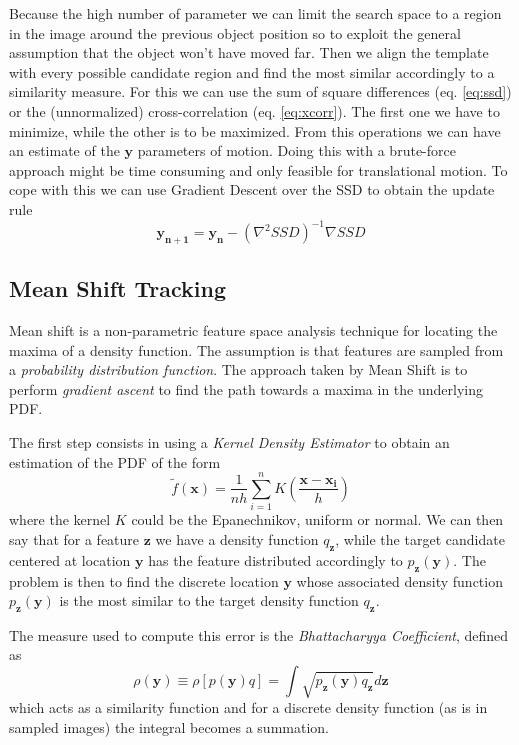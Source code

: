 \documentclass[a4paper,twocolumn]{article}
\begin{document}
Because the high number of parameter we can limit the search space to a region
in the image around the previous object position so to exploit the general
assumption that the object won't have moved far. Then we align the template with
every possible candidate region and find the most similar accordingly to a
similarity measure. For this we can use the sum of square differences (eq.
\ref{eq:ssd}) or the (unnormalized) cross-correlation (eq. \ref{eq:xcorr}). The
first one we have to minimize, while the other is to be maximized. From this
operations we can have an estimate of the $\mathbf{y}$ parameters of motion.
Doing this with a brute-force approach might be time consuming and only feasible
for translational motion. To cope with this we can use Gradient Descent over the
SSD to obtain the update rule
\begin{equation}
	\mathbf{y_{n+1}}=\mathbf{y_n}-(\nabla^2SSD)^{-1}\nabla SSD
\end{equation}


\subsection{Mean Shift Tracking}
Mean shift is a non-parametric feature space analysis technique for locating the
maxima of a density function. The assumption is that features are sampled from a
\textit{probability distribution function}. The approach taken by Mean Shift is
to perform \textit{gradient ascent} to find the path towards a maxima in the underlying
PDF.

The first step consists in using a \textit{Kernel Density Estimator} to obtain
an estimation of the PDF of the form
\begin{equation}
	\tilde{f}(\mathbf{x})=\frac{1}{nh}\sum_{i=1}^{n}K\left(\frac{\mathbf{x-x_i}}{h}\right)
				\label{eq:kernel-density-est}
\end{equation}
where the kernel $K$ could be the Epanechnikov, uniform or normal. We can then
say that for a feature $\mathbf{z}$ we have a density function $q_\mathbf{z}$,
while the target candidate centered at location $\mathbf{y}$ has the feature
distributed accordingly to $p_\mathbf{z}(\mathbf{y})$. The problem is then to
find the discrete location $\mathbf{y}$ whose associated density function
$p_\mathbf{z}(\mathbf{y})$ is the most similar to the target density function
$q_\mathbf{z}$.

The measure used to compute this error is the \textit{Bhattacharyya
Coefficient}, defined as
\begin{equation}
	\rho(\mathbf{y})\equiv\rho[p(\mathbf{y})q]=
	\int\sqrt{p_{\mathbf{z}}(\mathbf{y})q_{\mathbf{z}}}d\mathbf{z}
	\label{eq:bhatta-coeff}
\end{equation}
which acts as a similarity function and for a discrete density function
(as is in sampled images) the integral becomes a summation.
\end{document}

